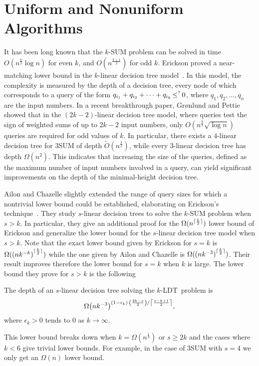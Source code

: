\section{Uniform and Nonuniform Algorithms}

It has been long known that the \(k\)-SUM problem can be solved in time
$O(n^{\frac{k}{2}}\log n)$ for even $k$, and $O(n^{\frac{k+1}{2}})$ for odd
$k$. Erickson proved a near-matching lower bound in the $k$-linear
decision tree model~\cite{Er99a}. In this model, the complexity is measured by the depth of
a decision tree, every node of which corresponds to a query of the form
$q_{i_1} + q_{i_2} + \cdots + q_{i_k} \mathop{\le}^{?} 0$, where $q_1, q_2, \ldots, q_n$ are the
input numbers. In a recent breakthrough paper, Gr\o nlund and
Pettie~\cite{GP18} showed that in the $(2k-2)$-linear decision tree model,
where queries test the sign of weighted sums of up to $2k-2$ input numbers, only
$O(n^\frac{k}{2}\sqrt{\log n})$ queries are required for odd values of $k$. In
particular, there exists a $4$-linear decision tree for 3SUM of depth
$\tilde{O}(n^\frac{3}{2})$, while every 3-linear decision tree has depth $\Omega
(n^2)$. This indicates that increasing the size of the queries,
defined as the maximum number of input numbers involved in a query, can yield
significant improvements on the depth of the minimal-height decision tree.

Ailon and Chazelle slightly extended the range of query sizes for which a
nontrivial lower bound could be established, elaborating on Erickson's
technique~\cite{AC05}.
%
They study \(s\)-linear decision trees to solve the \(k\)-SUM problem when
\(s > k\). In particular, they give an additional proof for the
$\Omega(n^{\lceil\frac{k}{2}\rceil})$ lower bound of Erickson and
generalize the lower bound for the \(s\)-linear decision tree model when \(s >
k\). Note that the exact lower bound given by Erickson for \(s = k\) is
$\Omega({(nk^{-k})}^{\lceil\frac{k}{2}\rceil})$ while the one given by
Ailon and Chazelle is $\Omega({(nk^{-3})}^{\lceil\frac{k}{2}\rceil})$. Their result
improves therefore the lower bound for \(s = k\) when \(k\) is large.
The lower bound they prove for \(s > k\) is the following
\begin{theorem}
The depth of an $s$-linear decision tree solving the \(k\)-LDT\ problem is
$$
{\Omega\mleft(nk^{-3}\mright)}^{
	(1-\epsilon_k)
	\,
	{\left(\frac{2k-s}{2}\right)}
	/
	{\left\lceil\frac{s-k+1}{2}\right\rceil}
},
$$
where \(\epsilon_k > 0\) tends to \(0\) as \(k \to\infty\).
\end{theorem}
This lower bound breaks down when
\(k = \Omega(n^{\frac{1}{3}})\) or \(s \ge 2 k\) and the cases where \(k < 6\)
give trivial lower bounds. For example, in the case
of 3SUM with \(s = 4\) we only get an $\Omega(n)$ lower bound.

